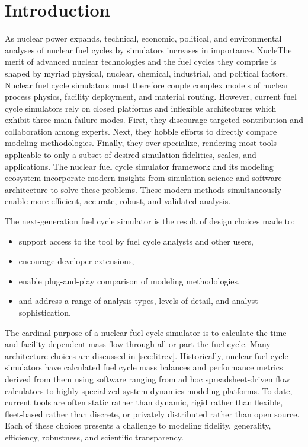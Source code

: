 
\section{Introduction}



As nuclear power expands, technical, economic, political, and environmental
analyses of nuclear fuel cycles by simulators increases in importance. NucleThe
merit of advanced nuclear technologies and the fuel cycles they comprise is
shaped by myriad physical, nuclear, chemical, industrial, and political
factors. Nuclear fuel cycle simulators must therefore couple complex models of
nuclear process physics, facility deployment, and material routing. However,
current fuel cycle simulators rely on closed platforms and inflexible
architectures which exhibit three main failure modes. First, they discourage
targeted contribution and collaboration among experts. Next, they hobble
efforts to directly compare modeling methodologies. Finally, they
over-specialize, rendering most tools applicable to only a subset of desired
simulation fidelities, scales, and applications.  The \Cyclus nuclear fuel
cycle simulator framework and its modeling ecosystem incorporate modern
insights from simulation science and software architecture to solve these
problems.  These modern methods simultaneously enable more efficient, accurate,
robust, and validated analysis.

The \Cyclus next-generation fuel cycle simulator is the result of design
choices made to:
\begin{itemize}
\item support access to the tool by fuel cycle analysts and other users,
\item encourage developer extensions,
\item enable plug-and-play comparison of modeling methodologies,
\item and address a range of analysis types, levels of detail, and analyst sophistication.
\end{itemize}

The cardinal purpose of a nuclear fuel cycle simulator is to calculate the
time- and facility-dependent mass flow through all or part the fuel cycle. Many
architecture choices are discussed in \ref{sec:litrev}.  Historically, nuclear
fuel cycle simulators have calculated fuel cycle mass balances and performance
metrics derived from them using software ranging from ad hoc spreadsheet-driven
flow calculators to highly specialized system dynamics modeling platforms. To
date, current tools are often static rather than dynamic, rigid rather than
flexible, fleet-based rather than discrete, or privately distributed rather
than open source. Each of these choices presents a challenge to modeling
fidelity, generality, efficiency, robustness, and scientific transparency.

